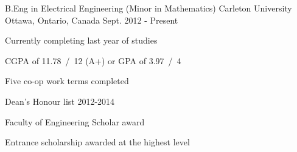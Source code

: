 

\begin{cventries}

  \cventry
    {B.Eng in Electrical Engineering (Minor in Mathematics)} %
    {Carleton University} %
    {Ottawa, Ontario, Canada} %
    {Sept. 2012 - Present} %
    {
      \begin{cvitems} %
        \item {Currently completing last year of studies}
        \item {CGPA of 11.78~/~12 (A+) or GPA of 3.97~/~4}
        \item {Five co-op work terms completed}
        \item {Dean's Honour list 2012-2014}
        \item {Faculty of Engineering Scholar award}
        \item {Entrance scholarship awarded at the highest level}
      \end{cvitems}
    }

\end{cventries}

